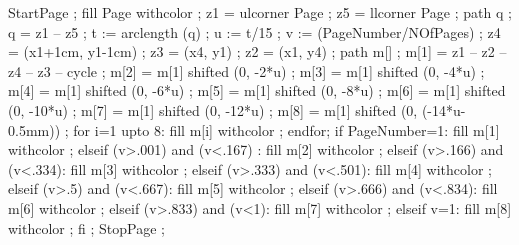 



StartPage ;
fill Page withcolor  ;
z1 = ulcorner Page ;
z5 = llcorner Page ;
path q ;
q = z1 -- z5 ;
t := arclength (q) ;
u := t/15 ;
v := (PageNumber/NOfPages) ;
z4 = (x1+1cm, y1-1cm) ;
z3 = (x4, y1) ;
z2 = (x1, y4) ;
path m[] ;
m[1] = z1 -- z2 -- z4 -- z3 -- cycle ;
m[2] = m[1] shifted (0, -2*u) ;
m[3] = m[1] shifted (0, -4*u) ;
m[4] = m[1] shifted (0, -6*u) ;
m[5] = m[1] shifted (0, -8*u) ;
m[6] = m[1] shifted (0, -10*u) ;
m[7] = m[1] shifted (0, -12*u) ;
m[8] = m[1] shifted (0, (-14*u-0.5mm)) ;
for i=1 upto 8:
	fill m[i] withcolor ;
endfor;
if PageNumber=1:
	fill m[1] withcolor  ;
elseif (v>.001) and (v<.167) :
	fill m[2] withcolor  ;	
elseif (v>.166) and (v<.334):
	fill m[3] withcolor  ;	
elseif (v>.333) and (v<.501):
	fill m[4] withcolor  ;	
elseif (v>.5) and (v<.667):
	fill m[5] withcolor  ;	
elseif (v>.666) and (v<.834):
	fill m[6] withcolor  ;	
elseif (v>.833) and (v<1):
	fill m[7] withcolor  ;	
elseif v=1:
	fill m[8] withcolor  ;
fi ;
StopPage ;

\stopuseMPgraphic 




\lecback{\setuplayout[header=1.5cm]\setupbackgrounds[page][background={lecbackground,slidetitle}]}
\titback{\setuplayout[header=0cm]\setupbackgrounds[page][background=lecbackground]}
\picback{\setuplayout[header=0cm]\setupbackgrounds[page][background={lecbackground,slidetitle}]}
\noback{\setupbackgrounds[page][background=nobackground]}


\setupcombinations[distance=0cm]


\setupitemize[1][inmargin][color=outer]

\protect
\stopmodule

\endinput

